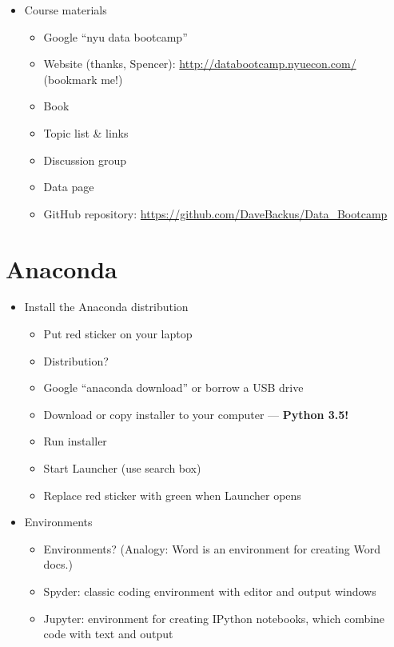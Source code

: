 \documentclass[11pt]{article}
\begin{document}
\begin{itemize}
\item Course materials
\begin{itemize}
\item Google ``nyu data bootcamp''
\item Website (thanks, Spencer):  \url{http://databootcamp.nyuecon.com/}  (bookmark me!)
\item Book
\item Topic list \& links
\item Discussion group
\item Data page
\item GitHub repository:  \url{https://github.com/DaveBackus/Data_Bootcamp}
\end{itemize}

\end{itemize}


\section*{Anaconda}

\begin{itemize}
\item Install the Anaconda distribution
\begin{itemize}
\item Put red sticker on your laptop
\item Distribution?
\item Google ``anaconda download'' or borrow a USB drive
\item Download or copy installer to your computer --- {\bf Python 3.5!}
\item Run installer
\item Start Launcher (use search box)
\item Replace red sticker with green when Launcher opens
\end{itemize}

\item Environments
\begin{itemize}
\item Environments?  (Analogy:  Word is an environment for creating Word docs.)
\item Spyder:  classic coding environment with editor and output windows
\item Jupyter:  environment for creating IPython notebooks, which combine code with text and output
\end{itemize}

\end{itemize}
\end{document}
